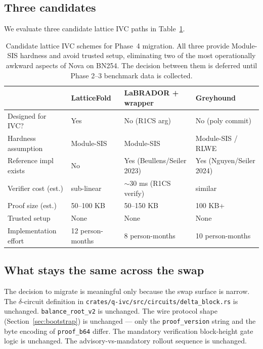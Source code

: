 \documentclass[11pt,a4paper]{article}
\begin{document}
\subsection{Three candidates}

We evaluate three candidate lattice IVC paths in Table~\ref{tab:lattice}.

\begin{table}[h]
\centering
\small
\begin{tabularx}{\linewidth}{l X X X}
\toprule
 & \textbf{LatticeFold} & \textbf{LaBRADOR + wrapper} & \textbf{Greyhound} \\
\midrule
Designed for IVC?     & Yes              & No (R1CS arg)             & No (poly commit) \\
Hardness assumption   & Module-SIS       & Module-SIS                & Module-SIS / RLWE \\
Reference impl exists & No               & Yes (Beullens/Seiler 2023)& Yes (Nguyen/Seiler 2024) \\
Verifier cost (est.)  & sub-linear       & $\sim$30 ms (R1CS verify) & similar \\
Proof size (est.)     & 50--100 KB       & 50--150 KB                & 100 KB+ \\
Trusted setup         & None             & None                      & None \\
Implementation effort & 12 person-months & 8 person-months           & 10 person-months \\
\bottomrule
\end{tabularx}
\caption{Candidate lattice IVC schemes for Phase~4 migration. All three
provide Module-SIS hardness and avoid trusted setup, eliminating two of
the most operationally awkward aspects of Nova on BN254. The decision
between them is deferred until Phase 2--3 benchmark data is collected.}
\label{tab:lattice}
\end{table}

\subsection{What stays the same across the swap}

The decision to migrate is meaningful only because the swap surface is
narrow. The $\delta$-circuit definition in
\texttt{crates/q-ivc/src/circuits/delta\_block.rs} is unchanged.
\texttt{balance\_root\_v2} is unchanged. The wire protocol shape
(Section~\ref{sec:bootstrap}) is unchanged --- only the
\texttt{proof\_version} string and the byte encoding of \texttt{proof\_b64}
differ. The mandatory verification block-height gate logic is unchanged.
The advisory-vs-mandatory rollout sequence is unchanged.
\end{document}
